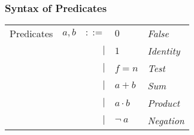 \documentclass[12pt, letterpaper]{article}
\def \sysname {\textsc{GARUDA 2.0}\xspace}
\begin{document}
      \subsubsection{Syntax of Predicates}\label{sec:spec:synt:pred}
          {\centering
          \begin{tabular}{l c r l l}
            Predicates  & $a,b$ & $::=$  & $0$          & \textit{False}    \\
                        &       & $\mid$ & $1$          & \textit{Identity} \\
                        &       & $\mid$ & $f = n$      & \textit{Test}     \\
                        &       & $\mid$ & $a + b$      & \textit{Sum}      \\
                        &       & $\mid$ & $a \cdot b$  & \textit{Product}  \\
                        &       & $\mid$ & $\neg\ a$    & \textit{Negation}
          \end{tabular}}
\end{document}
